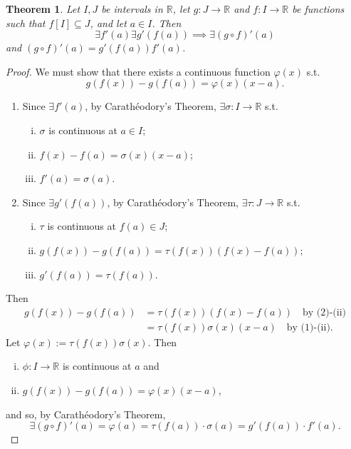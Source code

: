 \documentclass[12pt,openany]{book}
\newtheorem{theorem}{Theorem}[chapter]
\theoremstyle{definition}
\newcommand{\R}{\mathbb{R}}
\newcommand{\Caratheodroy}{Carath\'{e}odory}
\begin{document}
	\newpage
	\begin{tcolorbox}[colback=white,colframe=thmcolor,arc=5pt,title={\color{white}\bf Chain Rule}]
		\begin{theorem}
			Let $I,J$ be intervals in $\R$, let $g:J\to\R$ and $f:I\to\R$ be functions such that $f[I]\subseteq J$, and let $a\in I$. Then \[
			\exists f'(a)\exists g'(f(a))\implies\exists(g\circ f)'(a)
			\] and $(g\circ f)'(a)=g'(f(a))f'(a)$.
		\end{theorem}
	\end{tcolorbox}
	\begin{proof}
		We must show that there exists a continuous function $\varphi(x)$ s.t. \[
		g(f(x))-g(f(a))=\varphi(x)(x-a).
		\]
		\begin{enumerate}[(1)]
			\item Since $\exists f'(a)$, by \Caratheodroy's Theorem, $\exists\sigma:I\to\R$ s.t. \begin{enumerate}[(i)]
				\item $\sigma$ is continuous at $a\in I$;
				\item $f(x)-f(a)=\sigma(x)(x-a)$;
				\item $f'(a)=\sigma(a)$.
			\end{enumerate}
			\item Since $\exists g'(f(a))$, by \Caratheodroy's Theorem, $\exists\tau:J\to\R$ s.t. \begin{enumerate}[(i)]
				\item $\tau$ is continuous at $f(a)\in J$;
				\item $g(f(x))-g(f(a))=\tau(f(x))(f(x)-f(a))$;
				\item $g'(f(a))=\tau(f(a))$.
			\end{enumerate}
		\end{enumerate} Then \begin{align*}
			g(f(x))-g(f(a))&=\tau(f(x))(f(x)-f(a))\quad\text{by (2)-(ii)}\\
			&=\tau(f(x))\sigma(x)(x-a)\quad\text{by (1)-(ii)}.
		\end{align*} Let $\varphi(x):=\tau(f(x))\sigma(x)$. Then \begin{enumerate}[(i)]
			\item $\phi:I\to\R$ is continuous at $a$ and
			\item $g(f(x))-g(f(a))=\varphi(x)(x-a)$,
		\end{enumerate} and so, by \Caratheodroy's Theorem, \[
		\exists(g\circ f)'(a)=\varphi(a)=\tau(f(a))\cdot \sigma(a)=g'(f(a))\cdot f'(a).
		\]
	\end{proof}
\end{document}
